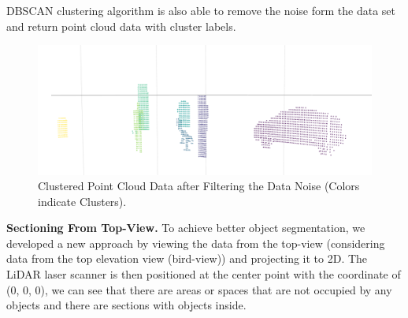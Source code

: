 DBSCAN clustering algorithm is also able to remove the noise form the data set and return point cloud data with cluster labels. 


\begin{figure}
\begin{center}
  \includegraphics[width=.65\linewidth]{./images/seg_noise_removal.png}
  \caption[labelInTOC]{Clustered Point Cloud Data after Filtering the Data Noise (Colors indicate Clusters). }
  \label{fig:ClusteringWithNoiseFiltering}
\end{center}
\end{figure}



\textbf{Sectioning From Top-View.}
To achieve better object segmentation, we developed a new approach by viewing the data from the top-view (considering data from the top elevation view (bird-view)) and projecting it to 2D. The LiDAR laser scanner is then positioned at the center point with the coordinate of (0, 0, 0), we can see that there are areas or spaces that are not occupied by any objects and there are sections with objects inside.     

 




